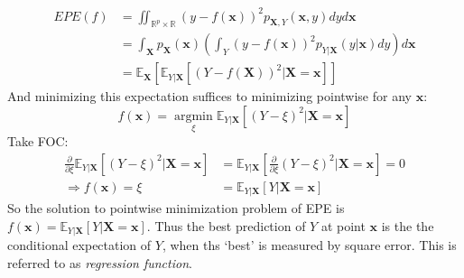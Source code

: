 \documentclass[a4paper, 11pt]{article}
\DeclareMathOperator*{\argmin}{argmin}
\begin{document}
\begin{equation}
	\begin{split}
		EPE(f) & = \iint_{\mathbb{R}^p\times \mathbb{R}} (y-f(\bm{x}))^2 p_{\bm{X},Y}(\bm{x},y) dy d \bm{x}\\
		& = \int_{\bm{X}} p_{\bm{X}}(\bm{x}) \left(\int_Y (y-f(\bm{x}))^2 p_{Y|\bm{X}}(y|\bm{x}) dy\right) d \bm{x}\\
		& = \mathbb{E}_{\bm{X}}\left[\mathbb{E}_{Y|\bm{X}}\left[(Y-f(\bm{X}))^2|\bm{X}=\bm{x}\right]\right]
	\end{split}
\end{equation}
And minimizing this expectation suffices to minimizing pointwise for any $\bm{x}$:
\begin{equation}
	f(\bm{x}) = \argmin\limits_{\xi}\mathbb{E}_{Y|\bm{X}}\left[(Y-\xi)^2|\bm{X}=\bm{x}\right]
\end{equation}
Take FOC: 
\begin{equation}
	\begin{split}
		\frac{\partial }{\partial \xi} \mathbb{E}_{Y|\bm{X}}\left[(Y-\xi)^2|\bm{X}=\bm{x}\right] &= \mathbb{E}_{Y|\bm{X}}\left[\frac{\partial }{\partial \xi}(Y-\xi)^2|\bm{X}=\bm{x}\right] = 0 \\
		\Rightarrow f(\bm{x}) = \xi &= \mathbb{E}_{Y|\bm{X}}\left[Y|\bm{X}=\bm{x}\right]
	\end{split}
\end{equation}
So the solution to pointwise minimization problem of EPE is $f(\bm{x})=\mathbb{E}_{Y|\bm{X}}\left[Y|\bm{X}=\bm{x}\right]$. Thus the best prediction of $Y$ at point $\bm{x}$ is the the conditional expectation of $Y$, when ths `best' is measured by square error. This is referred to as \emph{regression function}.
\end{document}

